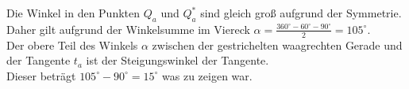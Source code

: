 \documentclass[10pt]{article}
\begin{document}
Die Winkel in den Punkten $Q_{a}$ und $Q_{a}^{*}$ sind gleich groß aufgrund der Symmetrie.\\
Daher gilt aufgrund der Winkelsumme im Viereck $\alpha=\frac{360^{\circ}-60^{\circ}-90^{\circ}}{2}=105^{\circ}$.\\
Der obere Teil des Winkels $\alpha$ zwischen der gestrichelten waagrechten Gerade und der Tangente $t_{a}$ ist der Steigungswinkel der Tangente.\\
Dieser beträgt $105^{\circ}-90^{\circ}=15^{\circ}$ was zu zeigen war.
\end{document}
